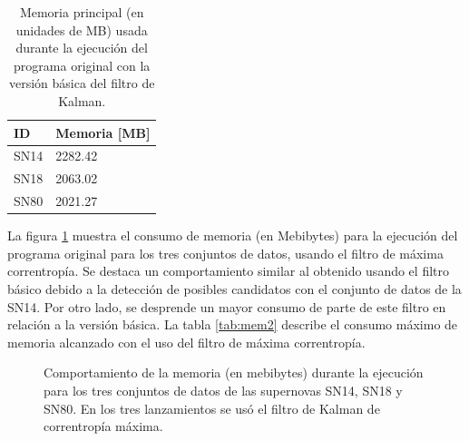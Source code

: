  
\begin{table}[h!]
\centering
\caption{Memoria principal (en unidades de MB) usada durante la ejecuci\'on del programa original con la versi\'on b\'asica del filtro de Kalman.}
\begin{tabular}{|l|l|}
\hline
\textbf{ID} & Memoria [MB]\\\hline\hline
SN14 & 2282.42\\\hline
SN18 & 2063.02\\\hline
SN80 & 2021.27\\\hline
\end{tabular}

\label{tab:mem1}
\end{table}


La figura \ref{fig:mem_mcc} muestra el consumo de memoria (en Mebibytes) para la ejecuci\'on del programa original para los tres conjuntos de datos, usando el filtro de m\'axima correntrop\'ia. Se destaca un comportamiento similar al obtenido usando el filtro b\'asico debido a  la detecci\'on de posibles candidatos con el conjunto de datos de la SN14. Por otro lado, se desprende un mayor consumo de parte de este filtro en relaci\'on a la versi\'on b\'asica. La tabla \ref{tab:mem2} describe el consumo m\'aximo de memoria alcanzado con el uso del filtro de m\'axima correntrop\'ia.
\bigskip

\begin{figure}[h!]
\centering
{}\hfill
{}\vfill
{}
\caption{Comportamiento de la memoria (en mebibytes) durante la ejecuci\'on para los tres conjuntos de datos de las supernovas SN14, SN18 y SN80. En los tres lanzamientos se us\'o el filtro de Kalman de correntrop\'ia m\'axima.}
\label{fig:mem_mcc}
\end{figure}


